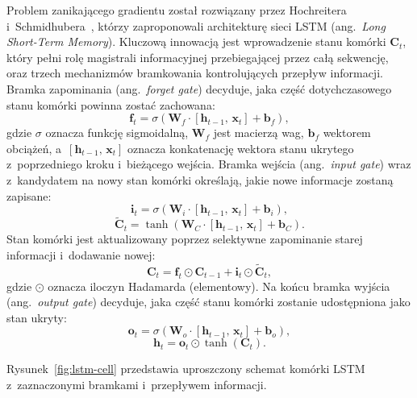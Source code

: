 Problem zanikającego gradientu został rozwiązany przez Hochreitera i~Schmidhu\-bera~\cite{hochreiter1997lstm}, którzy zaproponowali architekturę sieci LSTM (ang.~\textit{Long Short-Term Memory}). Kluczową innowacją jest wprowadzenie stanu komórki $\mathbf{C}_t$, który pełni rolę magistrali informacyjnej przebiegającej przez całą sekwencję, oraz trzech mechanizmów bramkowania kontrolujących przepływ informacji. Bramka zapominania (ang.~\textit{forget gate}) decyduje, jaka część dotychczasowego stanu komórki powinna zostać zachowana:
\begin{equation}
\label{eq:lstm-forget}
\mathbf{f}_t = \sigma(\mathbf{W}_f \cdot [\mathbf{h}_{t-1},\, \mathbf{x}_t] + \mathbf{b}_f),
\end{equation}
gdzie $\sigma$ oznacza funkcję sigmoidalną, $\mathbf{W}_f$ jest macierzą wag, $\mathbf{b}_f$ wektorem obciążeń, a~$[\mathbf{h}_{t-1},\, \mathbf{x}_t]$ oznacza konkatenację wektora stanu ukrytego z~poprzedniego kroku i~bieżącego wejścia. Bramka wejścia (ang.~\textit{input gate}) wraz z~kandydatem na nowy stan komórki określają, jakie nowe informacje zostaną zapisane:
\begin{equation}
\label{eq:lstm-input}
\mathbf{i}_t = \sigma(\mathbf{W}_i \cdot [\mathbf{h}_{t-1},\, \mathbf{x}_t] + \mathbf{b}_i),
\end{equation}
\begin{equation}
\label{eq:lstm-candidate}
\tilde{\mathbf{C}}_t = \tanh(\mathbf{W}_C \cdot [\mathbf{h}_{t-1},\, \mathbf{x}_t] + \mathbf{b}_C).
\end{equation}
Stan komórki jest aktualizowany poprzez selektywne zapominanie starej informacji i~dodawanie nowej:
\begin{equation}
\label{eq:lstm-cell}
\mathbf{C}_t = \mathbf{f}_t \odot \mathbf{C}_{t-1} + \mathbf{i}_t \odot \tilde{\mathbf{C}}_t,
\end{equation}
gdzie $\odot$ oznacza iloczyn Hadamarda (elementowy). Na końcu bramka wyjścia (ang.~\textit{output gate}) decyduje, jaka część stanu komórki zostanie udostępniona jako stan ukryty:
\begin{equation}
\label{eq:lstm-output}
\mathbf{o}_t = \sigma(\mathbf{W}_o \cdot [\mathbf{h}_{t-1},\, \mathbf{x}_t] + \mathbf{b}_o),
\end{equation}
\begin{equation}
\label{eq:lstm-hidden}
\mathbf{h}_t = \mathbf{o}_t \odot \tanh(\mathbf{C}_t).
\end{equation}

Rysunek~\ref{fig:lstm-cell} przedstawia uproszczony schemat komórki LSTM z~zaznaczonymi bramkami i~przepływem informacji.


